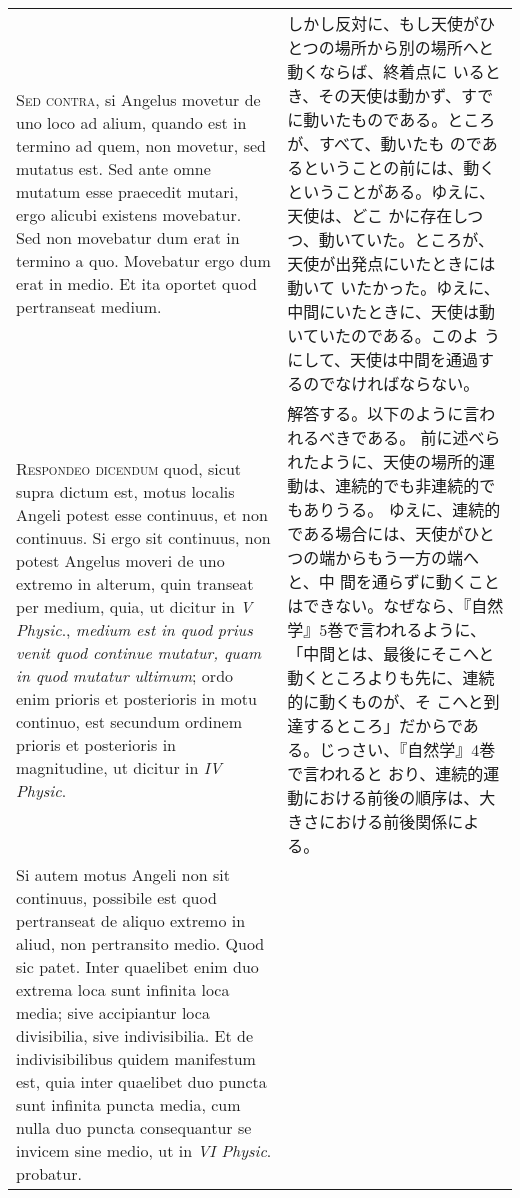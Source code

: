 \documentclass[10pt]{jsarticle} %
\begin{document}
\begin{longtable}{p{21em}p{21em}}
{\scshape Sed contra}, si Angelus movetur de uno loco
ad alium, quando est in termino ad quem, non movetur, sed mutatus
est. Sed ante omne mutatum esse praecedit mutari, ergo alicubi existens
movebatur. Sed non movebatur dum erat in termino a quo. Movebatur ergo
dum erat in medio. Et ita oportet quod pertranseat medium.

&

しかし反対に、もし天使がひとつの場所から別の場所へと動くならば、終着点に
 いるとき、その天使は動かず、すでに動いたものである。ところが、すべて、動いたも
 のであるということの前には、動くということがある。ゆえに、天使は、どこ
 かに存在しつつ、動いていた。ところが、天使が出発点にいたときには動いて
 いたかった。ゆえに、中間にいたときに、天使は動いていたのである。このよ
 うにして、天使は中間を通過するのでなければならない。
\\


{\scshape Respondeo dicendum} quod, sicut supra dictum
est, motus localis Angeli potest esse continuus, et non continuus. Si
ergo sit continuus, non potest Angelus moveri de uno extremo in alterum,
quin transeat per medium, quia, ut dicitur in {\itshape V Physic}., {\itshape medium est in
quod prius venit quod continue mutatur, quam in quod mutatur ultimum};
ordo enim prioris et posterioris in motu continuo, est secundum ordinem
prioris et posterioris in magnitudine, ut dicitur in {\itshape IV
 Physic}. 

&

解答する。以下のように言われるべきである。
前に述べられたように、天使の場所的運動は、連続的でも非連続的でもありうる。
 ゆえに、連続的である場合には、天使がひとつの端からもう一方の端へと、中
 間を通らずに動くことはできない。なぜなら、『自然学』5巻で言われるように、
 「中間とは、最後にそこへと動くところよりも先に、連続的に動くものが、そ
 こへと到達するところ」だからである。じっさい、『自然学』4巻で言われると
 おり、連続的運動における前後の順序は、大きさにおける前後関係による。

\\


Si autem
motus Angeli non sit continuus, possibile est quod pertranseat de aliquo
extremo in aliud, non pertransito medio. Quod sic patet. Inter quaelibet
enim duo extrema loca sunt infinita loca media; sive accipiantur loca
divisibilia, sive indivisibilia. Et de indivisibilibus quidem manifestum
est, quia inter quaelibet duo puncta sunt infinita puncta media, cum
nulla duo puncta consequantur se invicem sine medio, ut in {\itshape VI
Physic}. probatur. 



\end{longtable}
\end{document}
